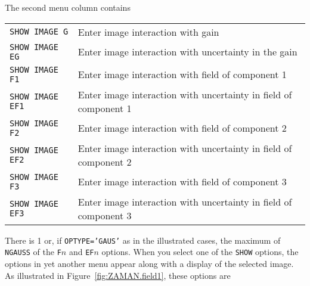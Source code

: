 \documentclass[twoside]{article}
\begin{document}
The second menu column contains
\begin{center}
\begin{tabular}{|l|l|}\hline
 {\tt SHOW IMAGE G } & Enter image interaction with gain\\
 {\tt SHOW IMAGE EG } & Enter image interaction with uncertainty in
                     the gain\\
 {\tt SHOW IMAGE F1 } & Enter image interaction with field of
                     component 1\\
 {\tt SHOW IMAGE EF1} & Enter image interaction with uncertainty in
                     field of component 1\\
 {\tt SHOW IMAGE F2 } & Enter image interaction with field of
                     component 2\\
 {\tt SHOW IMAGE EF2} & Enter image interaction with uncertainty in
                     field of component 2\\
 {\tt SHOW IMAGE F3} & Enter image interaction with field of component
                     3\\
 {\tt SHOW IMAGE EF3} & Enter image interaction with uncertainty in
                     field of component 3\\ \hline
\end{tabular}
\end{center}
There is 1 or, if {\tt OPTYPE='GAUS'} as in the illustrated cases,
the maximum of {\tt NGAUSS} of the {\tt F}$n$ and {\tt EF}$n$ options.
When you select one of the {\tt SHOW} options, the options in yet
another menu appear along with a display of the selected image.  As
illustrated in Figure~\ref{fig:ZAMAN.field1}, these options are
\end{document}
